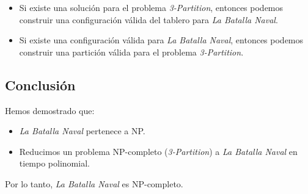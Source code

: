 \begin{itemize}
    \item Si existe una solución para el problema \textit{3-Partition}, entonces podemos construir una configuración válida del tablero para \textit{La Batalla Naval}.
    \item Si existe una configuración válida para \textit{La Batalla Naval}, entonces podemos construir una partición válida para el problema \textit{3-Partition}.
\end{itemize}

\subsection*{Conclusión}

Hemos demostrado que:
\begin{itemize}
    \item \textit{La Batalla Naval} pertenece a NP.
    \item Reducimos un problema NP-completo (\textit{3-Partition}) a \textit{La Batalla Naval} en tiempo polinomial.
\end{itemize}

Por lo tanto, \textit{La Batalla Naval} es NP-completo.